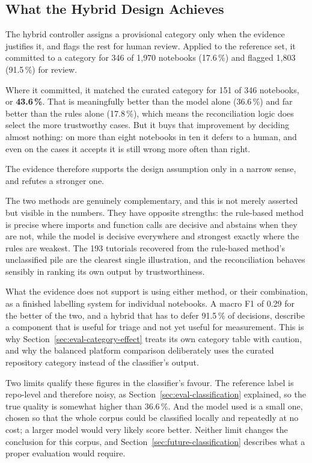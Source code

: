 \subsection{What the Hybrid Design Achieves}

The hybrid controller assigns a provisional category only when the evidence justifies it, and flags the rest for human review. Applied to the reference set, it committed to a category for 346 of 1{,}970 notebooks (17.6\,\%) and flagged 1{,}803 (91.5\,\%) for review.

Where it committed, it matched the curated category for 151 of 346 notebooks, or \textbf{43.6\,\%}. That is meaningfully better than the model alone (36.6\,\%) and far better than the rules alone (17.8\,\%), which means the reconciliation logic does select the more trustworthy cases. But it buys that improvement by deciding almost nothing: on more than eight notebooks in ten it defers to a human, and even on the cases it accepts it is still wrong more often than right.

The evidence therefore supports the design assumption only in a narrow sense, and refutes a stronger one.

The two methods are genuinely complementary, and this is not merely asserted but visible in the numbers. They have opposite strengths: the rule-based method is precise where imports and function calls are decisive and abstains when they are not, while the model is decisive everywhere and strongest exactly where the rules are weakest. The 193 tutorials recovered from the rule-based method's unclassified pile are the clearest single illustration, and the reconciliation behaves sensibly in ranking its own output by trustworthiness.

What the evidence does not support is using either method, or their combination, as a finished labelling system for individual notebooks. A macro F1 of 0.29 for the better of the two, and a hybrid that has to defer 91.5\,\% of decisions, describe a component that is useful for triage and not yet useful for measurement. This is why Section~\ref{sec:eval-category-effect} treats its own category table with caution, and why the balanced platform comparison deliberately uses the curated repository category instead of the classifier's output.

Two limits qualify these figures in the classifier's favour. The reference label is repo-level and therefore noisy, as Section~\ref{sec:eval-classification} explained, so the true quality is somewhat higher than 36.6\,\%. And the model used is a small one, chosen so that the whole corpus could be classified locally and repeatedly at no cost; a larger model would very likely score better. Neither limit changes the conclusion for this corpus, and Section~\ref{sec:future-classification} describes what a proper evaluation would require.

